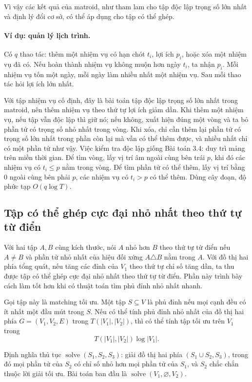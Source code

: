 \documentclass[11pt]{article}
\begin{document}
Vì vậy các kết quả của matroid, như tham lam cho tập độc lập trọng số lớn nhất
và định lý đổi cơ sở, có thể áp dụng cho tập có thể ghép.

\paragraph{Ví dụ: quản lý lịch trình.}
Có \(q\) thao tác: thêm một nhiệm vụ có hạn chót \(t_i\), lợi ích \(p_i\), hoặc
xóa một nhiệm vụ đã có. Nếu hoàn thành nhiệm vụ không muộn hơn ngày \(t_i\), ta
nhận \(p_i\). Mỗi nhiệm vụ tốn một ngày, mỗi ngày làm nhiều nhất một nhiệm vụ.
Sau mỗi thao tác hỏi lợi ích lớn nhất.

Với tập nhiệm vụ cố định, đây là bài toán tập độc lập trọng số lớn nhất trong
matroid, nên thêm nhiệm vụ theo thứ tự lợi ích giảm dần. Khi thêm một nhiệm vụ,
nếu tập vẫn độc lập thì giữ nó; nếu không, xuất hiện đúng một vòng và ta bỏ
phần tử có trọng số nhỏ nhất trong vòng. Khi xóa, chỉ cần thêm lại phần tử có
trọng số lớn nhất trong phần còn lại mà vẫn có thể thêm được, và nhiều nhất chỉ
có một phần tử như vậy. Việc kiểm tra độc lập giống Bài toán 3.4: duy trì mảng
trên miền thời gian. Để tìm vòng, lấy vị trí âm ngoài cùng bên trái \(p\), khi
đó các nhiệm vụ có \(t_i\le p\) nằm trong vòng. Để tìm phần tử có thể thêm, lấy
vị trí bằng \(0\) ngoài cùng bên phải \(p\), các nhiệm vụ có \(t_i>p\) có thể
thêm. Dùng cây đoạn, độ phức tạp \(O(q\log T)\).

\subsection{Tập có thể ghép cực đại nhỏ nhất theo thứ tự từ điển}

Với hai tập \(A,B\) cùng kích thước, nói \(A\) nhỏ hơn \(B\) theo thứ tự từ
điển nếu \(A\ne B\) và phần tử nhỏ nhất của hiệu đối xứng \(A\triangle B\) nằm
trong \(A\). Với đồ thị hai phía tổng quát, nếu tăng các đỉnh của \(V_1\) theo
thứ tự chỉ số tăng dần, ta thu được tập có thể ghép cực đại nhỏ nhất theo thứ
tự từ điển. Phần này trình bày cách làm tốt hơn khi có thuật toán tìm phủ đỉnh
nhỏ nhất nhanh.

Gọi tập này là matching tối ưu. Một tập \(S\subseteq V\) là phủ đỉnh nếu mọi
cạnh đều có ít nhất một đầu mút trong \(S\). Nếu có thể tính phủ đỉnh nhỏ nhất
của đồ thị hai phía \(G=(V_1,V_2,E)\) trong \(T(|V_1|,|V_2|)\), thì có thể tính
tập tối ưu trên \(V_1\) trong
\[
  T(|V_1|,|V_2|)\log |V_1|.
\]

Định nghĩa thủ tục \(\operatorname{solve}(S_1,S_2,S_3)\): giải đồ thị hai phía
\((S_1\cup S_2,S_3)\), trong đó mọi phần tử của \(S_2\) có chỉ số nhỏ hơn mọi
phần tử của \(S_1\), và \(S_2\) chắc chắn thuộc lời giải tối ưu. Bài toán ban
đầu là \(\operatorname{solve}(V_1,\varnothing,V_2)\).
\end{document}
